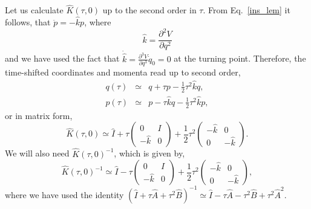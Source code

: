 \documentclass[journal=jpcafh,manuscript=article]{achemso}
\begin{document}
Let us calculate $\hat{K}(\tau, 0)$ up to the second order in
$\tau$. From Eq.~\ref{ins_lem} it follows, that $\ddot{p} =-\hat{k}p$,
where $$\hat{k}=\frac{\partial^2V}{\partial q^2}$$ and we have used the
fact that $\dot{\hat{k}}=\frac{\partial^3V}{\partial q^3}\dot{q}_0=0$ at
the turning point. Therefore, the time-shifted coordinates and momenta
read up to second order, 
\begin{eqnarray}
  \label{b4}
  q(\tau)&\simeq&q+\tau p-\frac{1}{2}\tau^2\hat{k}q,\\
  p(\tau)&\simeq&p-\tau\hat{k}q-\frac{1}{2}\tau^2\hat{k}p, \nonumber
\end{eqnarray}
or in matrix form,
\begin{equation}
  \label{b5}
  \hat{K}(\tau,0)\simeq\hat{I}+
  \tau\left(\begin{array}{cc}0&I\\-\hat{k}&0\end{array}\right)+
  \frac{1}{2}\tau^2\left(\begin{array}{cc}-\hat{k}&0\\0&-\hat{k}\end{array}\right).
\end{equation}
We will also need $\hat{K}(\tau,0)^{-1}$, which is given by,
\begin{equation}
  \label{b6}
  \hat{K}(\tau,0)^{-1}\simeq\hat{I}-
  \tau\left(\begin{array}{cc}0&I\\-\hat{k}&0\end{array}\right)+
  \frac{1}{2}\tau^2\left(\begin{array}{cc}-\hat{k}&0\\0&-\hat{k}\end{array}\right),
\end{equation}
where we have used the identity
$(\hat{I}+\tau\hat{A}+\tau^2\hat{B})^{-1}\simeq\hat{I}-\tau\hat{A}-\tau^2\hat{B}+\tau^2\hat{A}^2$.
\end{document}
